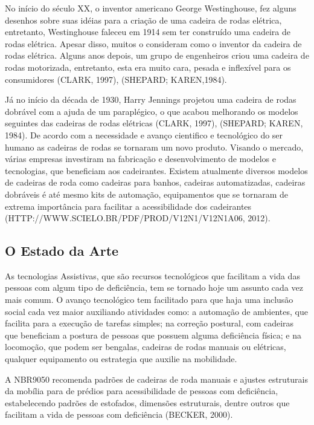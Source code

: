 No início do século XX, o inventor americano George Westinghouse, fez alguns desenhos sobre suas idéias para a criação de uma cadeira de rodas elétrica, entretanto, Westinghouse faleceu em 1914 sem ter construído uma cadeira de rodas elétrica. Apesar disso, muitos o consideram como o inventor da cadeira de rodas elétrica. Alguns anos depois, um grupo de engenheiros criou uma cadeira de rodas motorizada, entretanto, esta era muito cara, pesada e inflexível para os consumidores (CLARK, 1997), (SHEPARD; KAREN,1984).

Já no início da década de 1930, Harry Jennings projetou uma cadeira de rodas dobrável com a ajuda de um paraplégico, o que acabou melhorando os modelos seguintes das cadeiras de rodas elétricas (CLARK, 1997), (SHEPARD; KAREN, 1984).
De acordo com a necessidade e avanço cientifico e tecnológico do ser humano as cadeiras de rodas se tornaram um novo produto. Visando o mercado, várias empresas investiram na fabricação e desenvolvimento de modelos e tecnologias, que beneficiam aos cadeirantes. Existem atualmente diversos modelos de cadeiras de roda como cadeiras para banhos, cadeiras automatizadas, cadeiras dobráveis é até mesmo kits de automação, equipamentos que se tornaram de extrema importância para facilitar a acessibilidade dos cadeirantes (HTTP://WWW.SCIELO.BR/PDF/PROD/V12N1/V12N1A06, 2012).

\subsection{O Estado da Arte}

As tecnologias Assistivas, que são recursos tecnológicos que facilitam a vida das pessoas com algum tipo de deficiência, tem se tornado hoje um assunto cada vez mais comum. O avanço tecnológico tem facilitado para que haja uma inclusão social cada vez maior auxiliando atividades como: a automação de ambientes, que facilita para a execução de tarefas simples; na correção postural, com cadeiras que beneficiam a postura de pessoas que possuem alguma deficiência física; e na locomoção, que podem ser bengalas, cadeiras de rodas manuais ou elétricas, qualquer equipamento ou estrategia que auxilie na mobilidade.

A NBR9050 recomenda padrões de cadeiras de roda manuais e ajustes estruturais da mobília para de prédios para acessibilidade de pessoas com deficiência, estabelecendo padrões de estofados, dimensões estruturais, dentre outros que facilitam a vida de pessoas com deficiência (BECKER, 2000).

